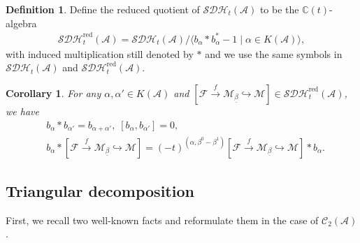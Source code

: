 \documentclass[12pt]{amsart}
\newtheorem{corollary}[theorem]{Corollary}
\theoremstyle{definition}
\newtheorem{definition}[theorem]{Definition}
\numberwithin{equation}{section}
\begin{document}
\begin{definition}
    Define the reduced quotient of $ \mathcal{SDH}_t(\mathcal{A}) $ to be the $ \mathbb{C}(t) $-algebra
    \begin{align*}
        \mathcal{SDH}_t^{\mathrm{red}}(\mathcal{A}) = \mathcal{SDH}_t(\mathcal{A})/\langle b_{\alpha} * b_{\alpha}^* -1 \mid \alpha \in K(\mathcal{A})\rangle,
    \end{align*}
    with induced multiplication still denoted by $ * $ and we use the same symbols in $ \mathcal{SDH}_t(\mathcal{A})  $ and $ \mathcal{SDH}_t^{\mathrm{red}}(\mathcal{A})  $.
\end{definition}

\begin{corollary}
    \label{balphaalpha'}
    For any $ \alpha,\alpha' \in K(\mathcal{A}) $ and $ [\mathcal{F} \xrightarrow{f} \mathcal{M}_{\underline{\beta}} \hookrightarrow \mathcal{M} ] \in \mathcal{SDH}_t^{\mathrm{red}}(\mathcal{A}) $, we have
    \begin{align*}
        &b_{\alpha} * b_{\alpha'} = b_{\alpha + \alpha'},\; [b_{\alpha},b_{\alpha'}] = 0,\\
         &b_{\alpha} * [\mathcal{F} \xrightarrow{f} \mathcal{M}_{\underline{\beta}} \hookrightarrow \mathcal{M} ] = (-t)^{(\alpha,\beta^0-\beta^1)}[\mathcal{F} \xrightarrow{f} \mathcal{M}_{\underline{\beta}} \hookrightarrow \mathcal{M} ] * b_{\alpha}.
    \end{align*}
\end{corollary}

\subsection{Triangular decomposition}\;

First, we recall two well-known facts and reformulate them in the case of $ \mathcal{C}_2(\mathcal{A}) $.
\end{document}
